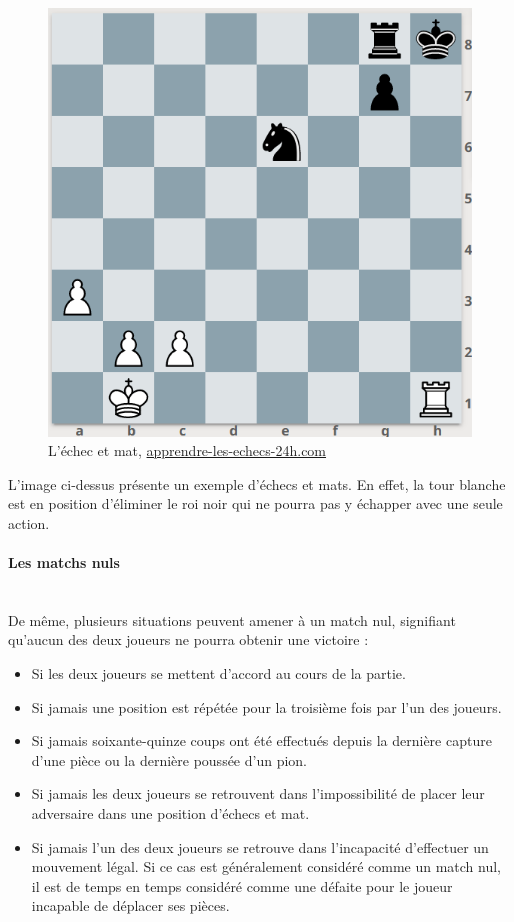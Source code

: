 \huge\documentclass{article}
\begin{document}
    \begin{figure}[h]
        \centering
        \includegraphics[scale=0.5]{img/echec-et-mat.png}
        \caption{L'échec et mat,
            \href{https://www.apprendre-les-echecs-24h.com/blog/echec-et-mat/}{apprendre-les-echecs-24h.com}}
    \end{figure}


    L'image ci-dessus présente un exemple d'échecs et mats. En effet, la tour blanche est en position d'éliminer le roi noir qui ne pourra pas y échapper avec une seule action.

    \paragraph{Les matchs nuls}
    ~~\\

    De même, plusieurs situations peuvent amener à un match nul, signifiant qu'aucun des deux joueurs ne pourra obtenir une victoire :

    \begin{itemize}
        \item Si les deux joueurs se mettent d'accord au cours de la partie.
        \item Si jamais une position est répétée pour la troisième fois par l'un des joueurs.
        \item Si jamais soixante-quinze coups ont été effectués depuis la dernière capture d'une pièce ou la dernière poussée d'un pion.
        \item Si jamais les deux joueurs se retrouvent dans l'impossibilité de placer leur adversaire dans une position d'échecs et mat.
        \item Si jamais l'un des deux joueurs se retrouve dans l'incapacité d'effectuer un mouvement légal. Si ce cas est généralement considéré comme un match nul, il est de temps en temps considéré comme une défaite pour le joueur incapable de déplacer ses pièces.
    \end{itemize}
\end{document}
